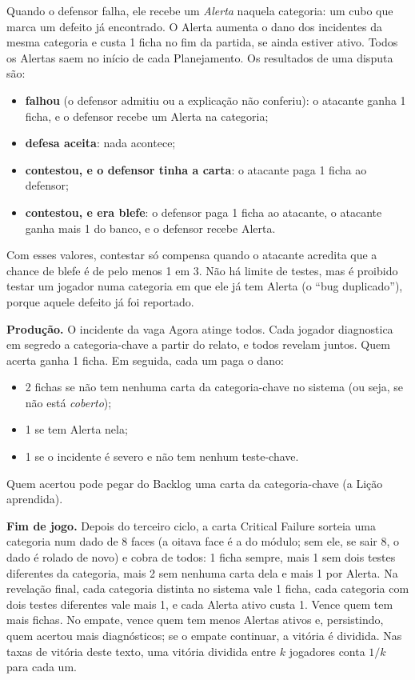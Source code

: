 Quando o defensor falha, ele recebe um \emph{Alerta} naquela categoria: um cubo que marca um defeito já
encontrado. O Alerta aumenta o dano dos incidentes da mesma categoria e custa 1 ficha no fim da partida, se ainda
estiver ativo. Todos os Alertas saem no início de cada Planejamento. Os resultados de uma disputa são:
\begin{itemize}
  \item \textbf{falhou} (o defensor admitiu ou a explicação não conferiu): o atacante ganha 1 ficha, e o defensor
    recebe um Alerta na categoria;
  \item \textbf{defesa aceita}: nada acontece;
  \item \textbf{contestou, e o defensor tinha a carta}: o atacante paga 1 ficha ao defensor;
  \item \textbf{contestou, e era blefe}: o defensor paga 1 ficha ao atacante, o atacante ganha mais 1 do banco, e o
    defensor recebe Alerta.
\end{itemize}
Com esses valores, contestar só compensa quando o atacante acredita que a chance de blefe é de pelo menos 1 em 3.
Não há limite de testes, mas é proibido testar um jogador numa categoria em que ele já tem Alerta (o ``bug
duplicado''), porque aquele defeito já foi reportado.

\textbf{Produção.} O incidente da vaga Agora atinge todos. Cada jogador diagnostica em segredo a categoria-chave a
partir do relato, e todos revelam juntos. Quem acerta ganha 1 ficha. Em seguida, cada um paga o dano:
\begin{itemize}
  \item 2 fichas se não tem nenhuma carta da categoria-chave no sistema (ou seja, se não está \emph{coberto});
  \item 1 se tem Alerta nela;
  \item 1 se o incidente é severo e não tem nenhum teste-chave.
\end{itemize}
Quem acertou pode pegar do Backlog uma carta da categoria-chave (a Lição aprendida).

\textbf{Fim de jogo.} Depois do terceiro ciclo, a carta Critical Failure sorteia uma categoria num dado de 8 faces
(a oitava face é a do módulo; sem ele, se sair 8, o dado é rolado de novo)
e cobra de todos: 1 ficha sempre, mais 1 sem dois testes diferentes da categoria, mais 2 sem nenhuma carta dela e
mais 1 por Alerta. Na revelação final, cada categoria distinta no sistema vale 1 ficha, cada categoria com dois
testes diferentes vale mais 1, e cada Alerta ativo custa 1. Vence quem tem mais fichas. No empate, vence
quem tem menos Alertas ativos e, persistindo, quem acertou mais diagnósticos; se o empate continuar, a vitória é
dividida. Nas taxas de vitória deste texto, uma vitória dividida entre $k$ jogadores conta $1/k$ para cada um.

